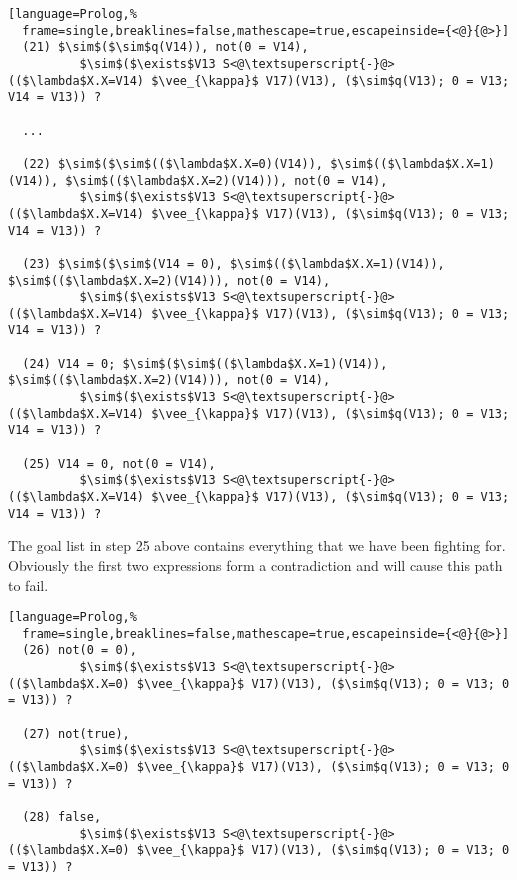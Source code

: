 \documentclass[inscr,ack,preface]{dithesis}
\theoremstyle{definition}
\begin{document}
\begin{lstlisting}[language=Prolog,%
  frame=single,breaklines=false,mathescape=true,escapeinside={<@}{@>}]
  (21) $\sim$($\sim$q(V14)), not(0 = V14),
          $\sim$($\exists$V13 S<@\textsuperscript{-}@>(($\lambda$X.X=V14) $\vee_{\kappa}$ V17)(V13), ($\sim$q(V13); 0 = V13; V14 = V13)) ?

  ...

  (22) $\sim$($\sim$(($\lambda$X.X=0)(V14)), $\sim$(($\lambda$X.X=1)(V14)), $\sim$(($\lambda$X.X=2)(V14))), not(0 = V14),
          $\sim$($\exists$V13 S<@\textsuperscript{-}@>(($\lambda$X.X=V14) $\vee_{\kappa}$ V17)(V13), ($\sim$q(V13); 0 = V13; V14 = V13)) ?

  (23) $\sim$($\sim$(V14 = 0), $\sim$(($\lambda$X.X=1)(V14)), $\sim$(($\lambda$X.X=2)(V14))), not(0 = V14),
          $\sim$($\exists$V13 S<@\textsuperscript{-}@>(($\lambda$X.X=V14) $\vee_{\kappa}$ V17)(V13), ($\sim$q(V13); 0 = V13; V14 = V13)) ?

  (24) V14 = 0; $\sim$($\sim$(($\lambda$X.X=1)(V14)), $\sim$(($\lambda$X.X=2)(V14))), not(0 = V14),
          $\sim$($\exists$V13 S<@\textsuperscript{-}@>(($\lambda$X.X=V14) $\vee_{\kappa}$ V17)(V13), ($\sim$q(V13); 0 = V13; V14 = V13)) ?

  (25) V14 = 0, not(0 = V14),
          $\sim$($\exists$V13 S<@\textsuperscript{-}@>(($\lambda$X.X=V14) $\vee_{\kappa}$ V17)(V13), ($\sim$q(V13); 0 = V13; V14 = V13)) ?
\end{lstlisting}

The goal list in step 25 above contains everything that we have been fighting for. Obviously the first two expressions form a contradiction and will cause this path to fail.
\begin{lstlisting}[language=Prolog,%
  frame=single,breaklines=false,mathescape=true,escapeinside={<@}{@>}]
  (26) not(0 = 0),
          $\sim$($\exists$V13 S<@\textsuperscript{-}@>(($\lambda$X.X=0) $\vee_{\kappa}$ V17)(V13), ($\sim$q(V13); 0 = V13; 0 = V13)) ?

  (27) not(true),
          $\sim$($\exists$V13 S<@\textsuperscript{-}@>(($\lambda$X.X=0) $\vee_{\kappa}$ V17)(V13), ($\sim$q(V13); 0 = V13; 0 = V13)) ?

  (28) false,
          $\sim$($\exists$V13 S<@\textsuperscript{-}@>(($\lambda$X.X=0) $\vee_{\kappa}$ V17)(V13), ($\sim$q(V13); 0 = V13; 0 = V13)) ?
\end{lstlisting}
\end{document}
